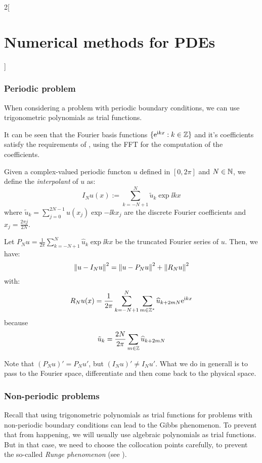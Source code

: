 \documentclass[../../../main_math.tex]{subfiles}
\begin{document}
\begin{multicols}{2}[\section{Numerical methods for PDEs}]
  \subsubsection{Periodic problem}
  When considering a problem with periodic boundary conditions, we can use trigonometric polynomials as trial functions.
  \begin{remark}
    It can be seen that the Fourier basis functions $\{ \mathrm{e}^{\mathrm{i} k x}:k\in\mathbb{Z}\}$ and it's coefficients satisfy the requirements of , using the FFT for the computation of the coefficients.
  \end{remark}
  \begin{definition}
    Given a complex-valued periodic functon $u$ defined in $[0,2\pi]$ and $N\in\mathbb{N}$, we define the \emph{interpolant} of $u$ as:
    $$
      I_Nu(x):=\sum_{k=-N+1}^N \tilde{u}_k\exp{\ii k x}
    $$
    where $\tilde{u}_k=\sum_{j=0}^{2N-1}u(x_j)\exp{-\ii k x_j}$ are the discrete Fourier coefficients and $x_j=\frac{2\pi j}{2N}$.
  \end{definition}
  \begin{proposition}
    Let $P_Nu=\frac{1}{2\pi}\sum_{k=-N+1}^N \widehat{u}_k\exp{\ii k x}$ be the truncated Fourier series of $u$. Then, we have:
    $$
      \left\|u-I_Nu\right\|^2=\left\|u-P_Nu\right\|^2+\left\|R_Nu\right\|^2
    $$
    with:
    $$
      R_Nu(x)= \frac{1}{2\pi}\sum_{k=-N+1}^N \sum_{m\in\mathbb{Z}^*} \widehat{u}_{k+2mN}\mathrm{e}^{\mathrm{i} k x}
    $$
    because $$
      \tilde{u}_k=\frac{2N}{2\pi}\sum_{m\in\mathbb{Z}} \widehat{u}_{k+2mN}
    $$
  \end{proposition}
  \begin{remark}
    Note that ${(P_Nu)}'=P_Nu'$, but ${(I_Nu)}'\neq I_Nu'$. What we do in generall is to pass to the Fourier space, differentiate and then come back to the physical space.
  \end{remark}
  \subsubsection{Non-periodic problems}
  \begin{remark}
    Recall that using trigonometric polynomials as trial functions for problems with non-periodic boundary conditions can lead to the Gibbs phenomenon. To prevent that from happening, we will usually use algebraic polynomials as trial functions. But in that case, we need to choose the collocation points carefully, to prevent the so-called \emph{Runge phenomenon} (see ).


\end{remark}
\end{multicols}
\end{document}
